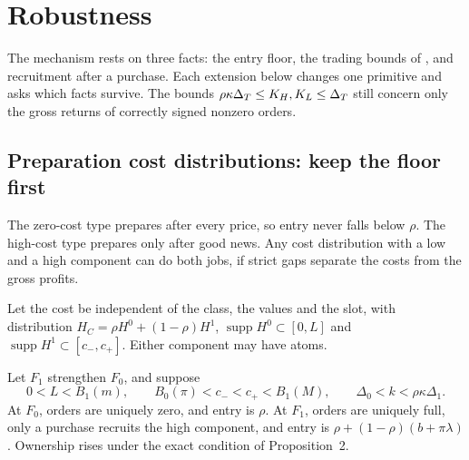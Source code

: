 \section{Robustness}\label{sec:10_robustness}

The mechanism rests on three facts: the entry floor, the trading bounds of , and
recruitment after a purchase. Each extension below changes one primitive and asks which facts survive.
 The bounds \(\rho\kappa\Delta_T\le K_H,K_L\le\Delta_T\) still concern only the gross returns of
correctly signed nonzero orders.

\subsection{Preparation cost distributions: keep the floor first}\label{sec:10_robustness-costs}

\begin{intuition}
The zero-cost type prepares after every price, so entry never falls below \(\rho\). The high-cost type prepares only
after good news. Any cost distribution with a low and a high component can do both jobs, if strict gaps separate the costs
from the gross profits.
\end{intuition}

Let the cost be independent of the class, the values and the slot, with distribution \(H_C=\rho H^0+(1-\rho)H^1\),
\(\operatorname{supp}H^0\subset[0,L]\) and \(\operatorname{supp}H^1\subset[c_-,c_+]\). Either component may have atoms.

\begin{resultbox}
Let \(F_1\) strengthen \(F_0\), and suppose
\[
0<L<B_1(m),\qquad B_0(\pi)<c_-<c_+<B_1(M),\qquad \Delta_0<k<\rho\kappa\Delta_1.
\]
At \(F_0\), orders are uniquely zero, and entry is \(\rho\). At \(F_1\), orders are uniquely full, only a purchase
recruits the high component, and entry is \(\rho+(1-\rho)(b+\pi\lambda)\). Ownership rises under the exact condition
of Proposition~2.
\end{resultbox}

